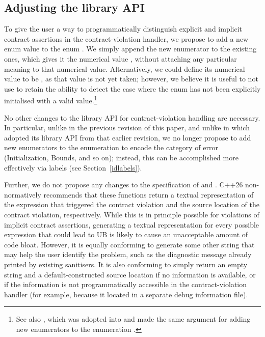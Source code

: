\subsection{Adjusting the library API}
\label{library}

To give the user a way to programmatically distinguish explicit and implicit contract assertions in the contract-violation handler, we propose to add a new enum value  to the enum \mbox{}. We simply append the new enumerator to the existing ones, which gives it the numerical value , without attaching any particular meaning to that numerical value. Alternatively, we could define its numerical value to be , as that value is not yet taken; however, we believe it is useful to not use  to retain the ability to detect the case where the enum has not been explicitly initialised with a valid value.\footnote{See also \cite{P3227R0}, which was adopted into \cite{P2900R14} and made the same argument for adding new enumerators to the enumeration .}

No other changes to the library API for contract-violation handling are necessary. In particular, unlike in the previous revision of this paper, and unlike in \cite{P3081R1} which adopted its library API from that earlier revision, we no longer propose to add new enumerators to the enumeration \mbox{} to encode the category of error (Initialization, Bounds, and so on); instead, this can be accomplished more effectively via labels (see Section~\ref{idlabels}).

Further, we do not propose any changes to the specification of  and . C++26 non-normatively recommends that these functions return a textual representation of the expression that triggered the contract violation and the source location of the contract violation, respectively. While this is in principle possible for violations of implicit contract assertions, generating a textual representation for every possible expression that could lead to UB is likely to cause an unacceptable amount of code bloat. However, it is equally conforming to generate some other string that may help the user identify the problem, such as the diagnostic message already printed by existing sanitisers. It is also conforming to simply return an empty string and a default-constructed source location if no information is available, or if the information is not programmatically accessible in the contract-violation handler (for example,
because it located in a separate debug information file). 

